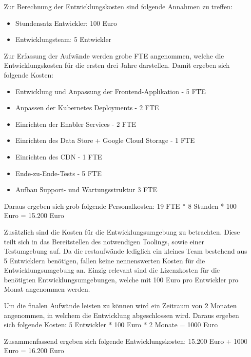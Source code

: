 Zur Berechnung der Entwicklungskosten sind folgende Annahmen zu treffen:
\begin{itemize}
    \item Stundensatz Entwickler: 100 Euro
    \item Entwicklungsteam: 5 Entwickler
\end{itemize}

Zur Erfassung der Aufwände werden grobe \ac{FTE} angenommen, welche die Entwicklungskosten für die ersten drei Jahre darstellen.
Damit ergeben sich folgende Kosten:
\begin{itemize}
    \item Entwicklung und Anpassung der Frontend-Applikation - 5 \ac{FTE}
    \item Anpassen der Kubernetes Deployments - 2 \ac{FTE}
    \item Einrichten der Enabler Services - 2 \ac{FTE}
    \item Einrichten des Data Store + Google Cloud Storage - 1 \ac{FTE}
    \item Einrichten des CDN - 1 \ac{FTE}
    \item Ende-zu-Ende-Tests - 5 \ac{FTE}
    \item Aufbau Support- und Wartungsstruktur 3 \ac{FTE}
\end{itemize}

Daraus ergeben sich grob folgende Personalkosten:
19 \ac{FTE} * 8 Stunden * 100 Euro = 15.200 Euro

Zusätzlich sind die Kosten für die Entwicklungsumgebung zu betrachten.
Diese teilt sich in das Bereitstellen des notwendigen Toolings, sowie einer Testumgebung auf.
Da die restaufwände lediglich ein kleines Team bestehend aus 5 Entwicklern benötigen, fallen keine nennenswerten Kosten für die Entwicklungsumgebung an.
Einzig relevant sind die Lizenzkosten für die benötigten Entwicklungsumgebungen, welche mit 100 Euro pro Entwickler pro Monat angenommen werden.

Um die finalen Aufwände leisten zu können wird ein Zeitraum von 2 Monaten angenommen, in welchem die Entwicklung abgeschlossen wird.
Daraus ergeben sich folgende Kosten:
5 Entwickler * 100 Euro * 2 Monate = 1000 Euro

Zusammenfassend ergeben sich folgende Entwicklungskosten:
15.200 Euro + 1000 Euro = 16.200 Euro


